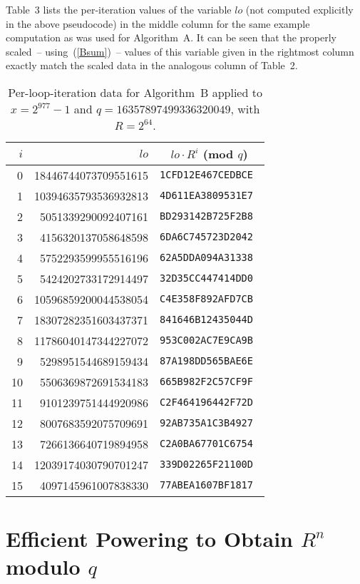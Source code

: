 \documentclass{article}
\begin{document}
Table~3 lists the per-iteration values of the variable $lo$ (not computed explicitly in the above pseudocode) in the middle column for the same example computation as was used for Algorithm~A. It can be seen that the properly scaled~-- using~(\ref{Bsum})~-- values of this variable given in the rightmost column exactly match the scaled data in the analogous column of Table~2.
\begin{table}
\begin{center}
\label{table_b}
\caption{Per-loop-iteration data for Algorithm~B applied to $x = 2^{977}-1$ and $q = 16357897499336320049$, with $R=2^{64}$.}
\begin{tabular}{r|r|c}
	$i$	&	$lo$\qquad\qquad\qquad&$lo \cdot R^{i}$ (mod $q$)\qquad\qquad	\\
\hline
	 0	&18446744073709551615	&{\tt 1CFD12E467CEDBCE	}	\\
	 1	&10394635793536932813	&{\tt 4D611EA3809531E7	}	\\
	 2	& 5051339290092407161	&{\tt BD293142B725F2B8	}	\\
	 3	& 4156320137058648598	&{\tt 6DA6C745723D2042	}	\\
	 4	& 5752293599955516196	&{\tt 62A5DDA094A31338	}	\\
	 5	& 5424202733172914497	&{\tt 32D35CC447414DD0	}	\\
	 6	&10596859200044538054	&{\tt C4E358F892AFD7CB	}	\\
	 7	&18307282351603437371	&{\tt 841646B12435044D	}	\\
	 8	&11786040147344227072	&{\tt 953C002AC7E9CA9B	}	\\
	 9	& 5298951544689159434	&{\tt 87A198DD565BAE6E	}	\\
	10	& 5506369872691534183	&{\tt 665B982F2C57CF9F	}	\\
	11	& 9101239751444920986	&{\tt C2F464196442F72D	}	\\
	12	& 8007683592075709691	&{\tt 92AB735A1C3B4927	}	\\
	13	& 7266136640719894958	&{\tt C2A0BA67701C6754	}	\\
	14	&12039174030790701247	&{\tt 339D02265F21100D	}	\\
	15	& 4097145961007838330	&{\tt 77ABEA1607BF1817	}
\end{tabular}
\end{center}
\end{table}




\section{Efficient Powering to Obtain $R^n$ modulo $q$}
\label{sect:algo_c}
\end{document}
